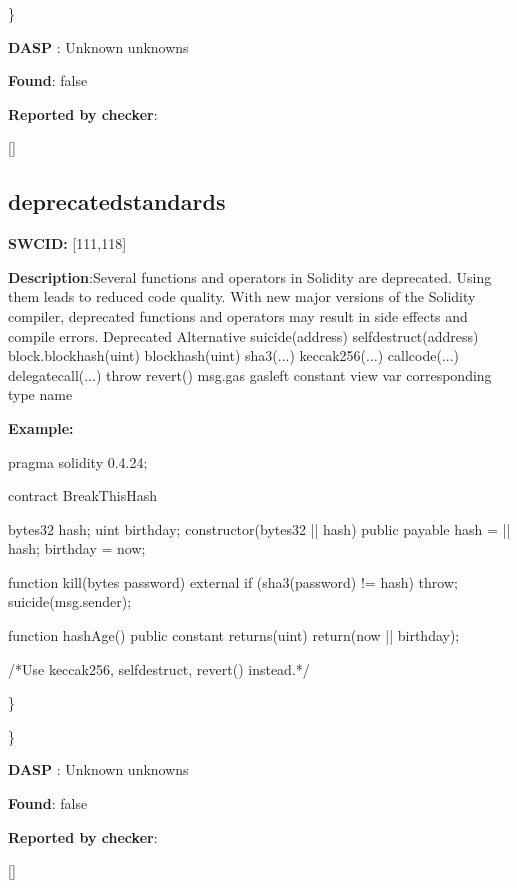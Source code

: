 \documentclass{article}
\begin{document}
\} 

\textbf{DASP} : Unknown unknowns

\textbf{Found}: false

\textbf{Reported by checker}: 
\begin{ffcode} 

[]
\end{ffcode} 
\subsection{deprecated{\textunderscore}standards} 
\textbf{SWC{\textunderscore}ID:} [111,118]

\textbf{Description}:Several functions and operators in Solidity are deprecated. Using them leads to reduced code quality. With new major versions of the Solidity compiler, deprecated functions and operators may result in side effects and compile errors.
  Deprecated              Alternative
  suicide(address)        selfdestruct(address)
  block.blockhash(uint)   blockhash(uint)
  sha3(...)               keccak256(...)
  callcode(...)           delegatecall(...)
  throw                   revert()
  msg.gas                 gasleft
  constant                view
  var                     corresponding type name


\textbf{Example:} 
\begin{ffcode} 

pragma solidity 0.4.24;

contract BreakThisHash {
    bytes32 hash;
    uint birthday;
    constructor(bytes32 |\textunderscore| hash) public payable {
        hash = |\textunderscore| hash;
        birthday = now;
    }

    function kill(bytes password) external {
        if (sha3(password) != hash) {
            throw;
        }
        suicide(msg.sender);
    }

    function hashAge() public constant returns(uint) {
        return(now |\textendash|  birthday);
    }
}

 /*Use keccak256, selfdestruct, revert() instead.*/ 

\end{ffcode} 
\} 

\} 

\textbf{DASP} : Unknown unknowns

\textbf{Found}: false

\textbf{Reported by checker}: 
\begin{ffcode} 

[]
\end{ffcode} 
\end{document}
